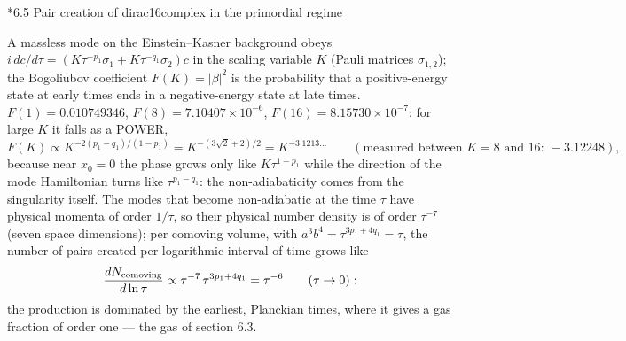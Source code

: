 \documentclass[10pt,a4paper]{article}
\makeatletter
\renewcommand\subsection{\@startsection{subsection}{2}{\z@}{-3.25ex\@plus -1ex \@minus -.2ex}{1.5ex \@plus .2ex}{\normalfont\large\bfseries\raggedright}}
\makeatother
\begin{document}
\subsection*{6.5 Pair creation of dirac16complex in the primordial regime}
A massless mode on the Einstein–Kasner background obeys $i\,dc/d\tau=(K\tau^{-p_1}\sigma_1+K\tau^{-q_1}\sigma_2)c$ in the scaling variable $K$ (Pauli matrices $\sigma_{1,2}$); the Bogoliubov coefficient $F(K)=|\beta|^2$ is the probability that a positive-energy state at early times ends in a negative-energy state at late times. $F(1)=0.010749346$, $F(8)=7.10407\times10^{-6}$, $F(16)=8.15730\times10^{-7}$: for large $K$ it falls as a POWER,
\begin{equation*}
F(K)\propto K^{-2(p_1-q_1)/(1-p_1)}=K^{-(3\sqrt2+2)/2}=K^{-3.1213\ldots}\qquad(\text{measured between }K=8\text{ and }16:\ -3.12248),
\end{equation*}
because near $x_0=0$ the phase grows only like $K\tau^{1-p_1}$ while the direction of the mode Hamiltonian turns like $\tau^{p_1-q_1}$: the non-adiabaticity comes from the singularity itself. The modes that become non-adiabatic at the time $\tau$ have physical momenta of order $1/\tau$, so their physical number density is of order $\tau^{-7}$ (seven space dimensions); per comoving volume, with $a^3b^4=\tau^{3p_1+4q_1}=\tau$, the number of pairs created per logarithmic interval of time grows like
\begin{equation*}
\frac{dN_{\rm comoving}}{d\ln\tau}\propto\tau^{-7}\,\tau^{3p_1+4q_1}=\tau^{-6}\qquad(\tau\to0):
\end{equation*}
the production is dominated by the earliest, Planckian times, where it gives a gas fraction of order one — the gas of section 6.3.
\end{document}
